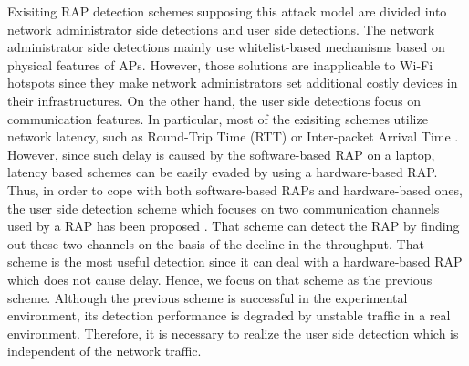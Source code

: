 \documentclass[conference]{IEEEtran}
\begin{document}
Exisiting RAP detection schemes supposing this attack model are divided into network administrator side detections and user side detections.
The network administrator side detections mainly use whitelist-based mechanisms based on physical features of APs\cite{prapd}\cite{clockskew}.
However, those solutions are inapplicable to Wi-Fi hotspots since they make network administrators set additional costly devices in their infrastructures.
On the other hand, the user side detections focus on communication features.
In particular, most of the exisiting schemes utilize network latency, such as Round-Trip Time (RTT) or Inter-packet Arrival Time \cite{rtt}\cite{iat}.
However, since such delay is caused by the software-based RAP on a laptop, latency based schemes can be easily evaded by using a hardware-based RAP.
Thus, in order to cope with both software-based RAPs and hardware-based ones, the user side detection scheme which focuses on two communication channels used by a RAP has been proposed \cite{previous}.
That scheme can detect the RAP by finding out these two channels on the basis of the decline in the throughput.
That scheme is the most useful detection since it can deal with a hardware-based RAP which does not cause delay.
Hence, we focus on that scheme \cite{previous} as the previous scheme.
Although the previous scheme is successful in the experimental environment, its detection performance is degraded by unstable traffic in a real environment.
Therefore, it is necessary to realize the user side detection which is independent of the network traffic.
\end{document}
